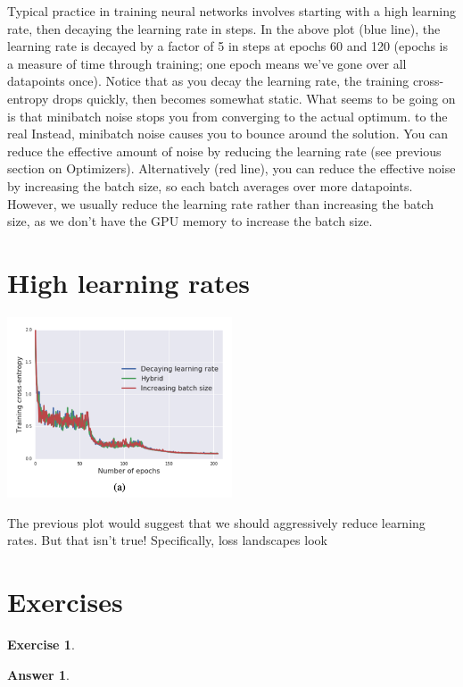 \documentclass{article}
\newtheorem{exercise}{Exercise}
\newtheorem{answer}{Answer}
\newcommand{\0}{\mathbf{0}}
\begin{document}
Typical practice in training neural networks involves starting with a high learning rate, then decaying the learning rate in steps.
In the above plot (blue line), the learning rate is decayed by a factor of 5 in steps at epochs 60 and 120 (epochs is a measure of time through training; one epoch means we've gone over all datapoints once).
Notice that as you decay the learning rate, the training cross-entropy drops quickly, then becomes somewhat static.
What seems to be going on is that minibatch noise stops you from converging to the actual optimum. to the real
Instead, minibatch noise causes you to bounce around the solution.
You can reduce the effective amount of noise by reducing the learning rate (see previous section on Optimizers).
Alternatively (red line), you can reduce the effective noise by increasing the batch size, so each batch averages over more datapoints.
However, we usually reduce the learning rate rather than increasing the batch size, as we don't have the GPU memory to increase the batch size.


\newpage
\section{High learning rates}

\begin{center}
  \includegraphics[width=0.5\textwidth]{schedule.png}
\end{center}

The previous plot would suggest that we should aggressively reduce learning rates.
But that isn't true!
Specifically, loss landscapes look


\section{Exercises}

\begin{exercise}
\end{exercise}

\begin{answer}
\end{answer}
\end{document}
